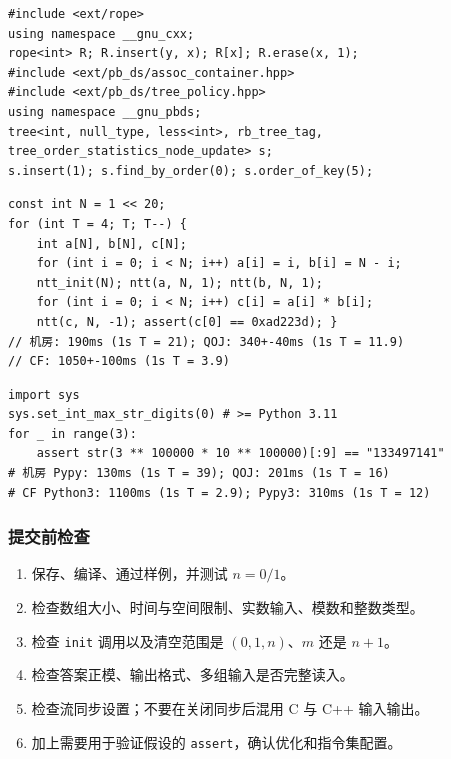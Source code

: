 \begin{verbatim}
#include <ext/rope>
using namespace __gnu_cxx;
rope<int> R; R.insert(y, x); R[x]; R.erase(x, 1);
#include <ext/pb_ds/assoc_container.hpp>
#include <ext/pb_ds/tree_policy.hpp>
using namespace __gnu_pbds;
tree<int, null_type, less<int>, rb_tree_tag,
tree_order_statistics_node_update> s;
s.insert(1); s.find_by_order(0); s.order_of_key(5);
\end{verbatim}

\begin{verbatim}
const int N = 1 << 20;
for (int T = 4; T; T--) {
    int a[N], b[N], c[N];
    for (int i = 0; i < N; i++) a[i] = i, b[i] = N - i;
    ntt_init(N); ntt(a, N, 1); ntt(b, N, 1);
    for (int i = 0; i < N; i++) c[i] = a[i] * b[i];
    ntt(c, N, -1); assert(c[0] == 0xad223d); }
// 机房: 190ms (1s T = 21); QOJ: 340+-40ms (1s T = 11.9)
// CF: 1050+-100ms (1s T = 3.9)
\end{verbatim}

\begin{verbatim}
import sys
sys.set_int_max_str_digits(0) # >= Python 3.11
for _ in range(3):
    assert str(3 ** 100000 * 10 ** 100000)[:9] == "133497141"
# 机房 Pypy: 130ms (1s T = 39); QOJ: 201ms (1s T = 16)
# CF Python3: 1100ms (1s T = 2.9); Pypy3: 310ms (1s T = 12)
\end{verbatim}

\subsubsection{提交前检查}
\begin{enumerate}[leftmargin=5mm]
  \setlength{\itemsep}{0pt}
  \item 保存、编译、通过样例，并测试 $n=0/1$。
  \item 检查数组大小、时间与空间限制、实数输入、模数和整数类型。
  \item 检查 \texttt{init} 调用以及清空范围是 $(0,1,n)$、$m$ 还是 $n+1$。
  \item 检查答案正模、输出格式、多组输入是否完整读入。
  \item 检查流同步设置；不要在关闭同步后混用 C 与 C++ 输入输出。
  \item 加上需要用于验证假设的 \texttt{assert}，确认优化和指令集配置。
\end{enumerate}

